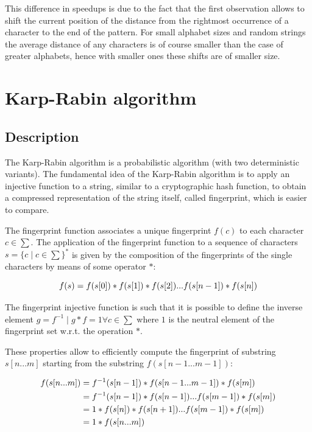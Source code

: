 \documentclass{article}
\begin{document}
This difference in speedups is due to the fact that the first observation allows to shift the current position of the distance from the rightmost occurrence of a character to the end of the pattern. For small alphabet sizes and random strings the average distance of any characters is of course smaller than the case of greater alphabets, hence with smaller ones these shifts are of smaller size.

\section{Karp-Rabin algorithm}

\subsection{Description}
The Karp-Rabin algorithm is a probabilistic algorithm (with two deterministic variants). The fundamental idea of the Karp-Rabin algorithm is to apply an injective function to a string, similar to a cryptographic hash function, to obtain a compressed representation of the string itself, called fingerprint, which is easier to compare.

The fingerprint function associates a unique fingerprint $f(c)$ to each character $c \in \sum$. The application of the fingerprint function to a sequence of characters $s = \{c \mid c \in \sum\}^*$ is given by the composition of the fingerprints of the single characters by means of some operator $*$:

\begin{equation*} \notag
    f(s) = f(s[0]) * f(s[1]) * f(s[2]) ... f(s[n - 1]) * f(s[n])
\end{equation*}

The fingerprint injective function is such that it is possible to define the inverse element $g = f^{-1} \mid g * f = 1 \forall c \in \sum$ where $1$ is the neutral element of the fingerprint set w.r.t. the operation $*$.

These properties allow to efficiently compute the fingerprint of substring $s[n ... m]$ starting from the substring $f(s[n - 1 ... m - 1])$:

\begin{equation} \notag
\begin{split}
f(s[n ... m]) &= f^{-1}(s[n - 1]) * f(s[n - 1 ... m - 1]) * f(s[m]) \\
    &= f^{-1}(s[n - 1]) * f(s[n - 1]) ... f(s[m - 1]) * f(s[m]) \\
    &= 1 * f(s[n]) * f(s[n + 1]) ... f(s[m - 1]) * f(s[m]) \\
    &= 1 * f(s[n ... m])
\end{split}
\end{equation}
\end{document}
